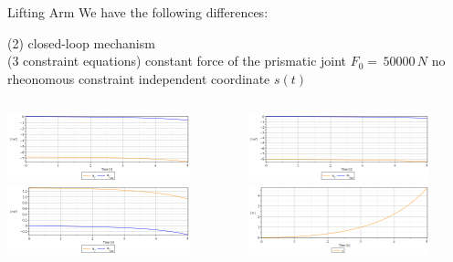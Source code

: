 \documentclass{beamer}              %
\begin{document}
	\begin{frame}{Lifting Arm}
		\footnotesize 	
		\centering
		We have the following differences:
		
		\smallskip
		
		\begin{tasks}(2)
			\task closed-loop mechanism\\ (3 constraint equations)
			\task constant force of the prismatic joint $F_0=\,50000\, N$ 
			\task no rheonomous constraint
			\task independent coordinate $s(t)$
		\end{tasks}
	\medskip
	    \begin{columns}
	    	\begin{column}{0.5\textwidth}
	    		\includegraphics[width=150pt]{grafici/alpha1.png}
	    		\includegraphics[width=150pt]{grafici/alpha2.png}
	    	\end{column}
	    	\begin{column}{0.5\textwidth}
	    		\includegraphics[width=150pt]{grafici/alpha3.png}
	    		\includegraphics[width=150pt]{grafici/s.png}
	    	\end{column}
	    \end{columns}
				
	\end{frame}	
\end{document}
